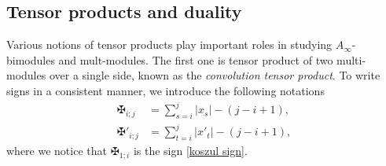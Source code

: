 \documentclass[11pt]{amsproc}
\def\ainf{A_\infty}
\theoremstyle{remark}
\numberwithin{equation}{section}
\begin{document}
\subsection{Tensor products and duality}

Various notions of tensor products play important roles in studying $\ainf$-bimodules and mult-modules.
The first one is tensor product of two multi-modules over a single side, known as the {\it convolution tensor product}.
To write signs in a consistent manner, we introduce the following notations
\begin{align}\label{koszul sign for cc}
\maltese_{i; j} & = \sum_{s=i}^{j} |x_{s}| - (j-i+1), \\
\maltese'_{i;j} & = \sum_{t=i}^{j} |x'_{t}| - (j-i+1),
\end{align}
where we notice that $\maltese_{1; i}$ is the sign \eqref{koszul sign}.
\end{document}
